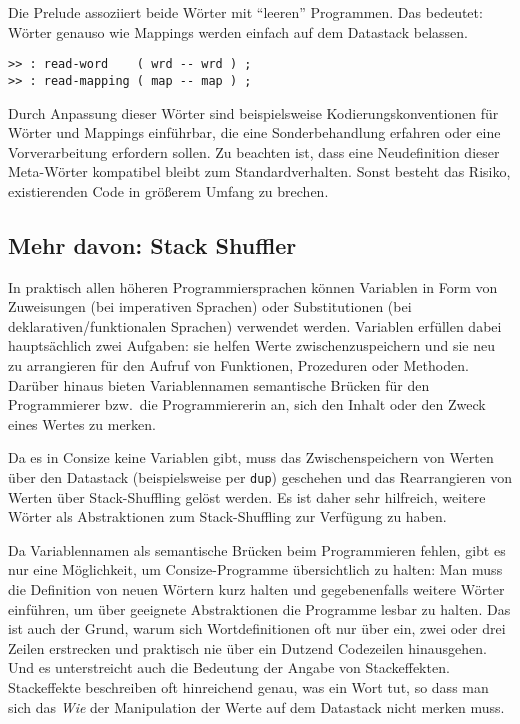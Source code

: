 Die Prelude assoziiert beide Wörter mit "`leeren"' Programmen. Das bedeutet: Wörter genauso wie Mappings werden einfach auf dem Datastack belassen.

\begin{verbatim}
>> : read-word    ( wrd -- wrd ) ;
>> : read-mapping ( map -- map ) ;
\end{verbatim}

Durch Anpassung dieser Wörter sind beispielsweise Kodierungskonventionen für Wörter und Mappings einführbar, die eine Sonderbehandlung erfahren oder eine Vorverarbeitung erfordern sollen. Zu beachten ist, dass eine Neudefinition dieser Meta-Wörter kompatibel bleibt zum Standardverhalten. Sonst besteht das Risiko, existierenden Code in größerem Umfang zu brechen.

\subsection{Mehr davon: Stack Shuffler}

In praktisch allen höheren Programmiersprachen können Variablen in Form von Zuweisungen (bei imperativen Sprachen) oder Substitutionen (bei deklarativen\slash funktionalen Sprachen) verwendet werden. Variablen erfüllen dabei hauptsächlich zwei Aufgaben: sie helfen Werte zwischenzuspeichern und sie neu zu arrangieren für den Aufruf von Funktionen, Prozeduren oder Methoden. Darüber hinaus bieten Variablennamen semantische Brücken für den Programmierer bzw.\ die Programmiererin an, sich den Inhalt oder den Zweck eines Wertes zu merken.

Da es in Consize keine Variablen gibt, muss das Zwischenspeichern von Werten über den Datastack (beispielsweise per \verb|dup|) geschehen und das Rearrangieren von Werten über Stack-Shuffling gelöst werden. Es ist daher sehr hilfreich, weitere Wörter als Abstraktionen zum Stack-Shuffling zur Verfügung zu haben.

Da Variablennamen als semantische Brücken beim Programmieren fehlen, gibt es nur eine Möglichkeit, um Consize-Programme übersichtlich zu halten: Man muss die Definition von neuen Wörtern kurz halten und gegebenenfalls weitere Wörter einführen, um über geeignete Abstraktionen die Programme lesbar zu halten. Das ist auch der Grund, warum sich Wortdefinitionen oft nur über ein, zwei oder drei Zeilen erstrecken und praktisch nie über ein Dutzend Codezeilen hinausgehen. Und es unterstreicht auch die Bedeutung der Angabe von Stackeffekten. Stackeffekte beschreiben oft hinreichend genau, was ein Wort tut, so dass man sich das \emph{Wie} der Manipulation der Werte auf dem Datastack nicht merken muss. 

